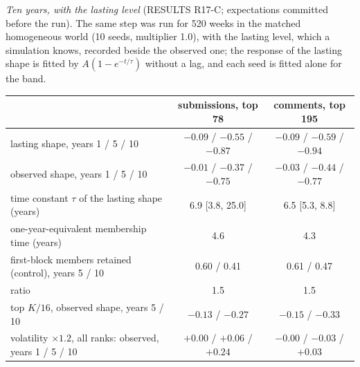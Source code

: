\documentclass[10pt]{article}
\begin{document}
\emph{Ten years, with the lasting level} (RESULTS R17-C; expectations committed before the run). The same step was run for 520 weeks in the matched homogeneous world (10 seeds, multiplier 1.0), with the lasting level, which a simulation knows, recorded beside the observed one; the response of the lasting shape is fitted by $A(1-e^{-t/\tau})$ without a lag, and each seed is fitted alone for the band.
\begin{center}\small\begin{tabular}{lcc}
\toprule
 & submissions, top 78 & comments, top 195\\
\midrule
lasting shape, years 1 / 5 / 10 & $-0.09$ / $-0.55$ / $-0.87$ & $-0.09$ / $-0.59$ / $-0.94$\\
observed shape, years 1 / 5 / 10 & $-0.01$ / $-0.37$ / $-0.75$ & $-0.03$ / $-0.44$ / $-0.77$\\
time constant $\tau$ of the lasting shape (years) & 6.9 [3.8, 25.0] & 6.5 [5.3, 8.8]\\
one-year-equivalent membership time (years) & 4.6 & 4.3\\
first-block members retained (control), years 5 / 10 & 0.60 / 0.41 & 0.61 / 0.47\\
ratio & 1.5 & 1.5\\
top $K/16$, observed shape, years 5 / 10 & $-0.13$ / $-0.27$ & $-0.15$ / $-0.33$\\
volatility $\times1.2$, all ranks: observed, years 1 / 5 / 10 & $+0.00$ / $+0.06$ / $+0.24$ & $-0.00$ / $-0.03$ / $+0.03$\\
\bottomrule
\end{tabular}\end{center}
\end{document}
